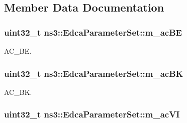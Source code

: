 \subsection{Member Data Documentation}
\subsubsection[{\texorpdfstring{m\+\_\+ac\+BE}{m_acBE}}]{\setlength{\rightskip}{0pt plus 5cm}uint32\+\_\+t ns3\+::\+Edca\+Parameter\+Set\+::m\+\_\+ac\+BE\hspace{0.3cm}{\ttfamily [private]}}\hypertarget{classns3_1_1EdcaParameterSet_a43ef5005534c79ea230fc9104640e59c}{}\label{classns3_1_1EdcaParameterSet_a43ef5005534c79ea230fc9104640e59c}


A\+C\+\_\+\+BE. 

\subsubsection[{\texorpdfstring{m\+\_\+ac\+BK}{m_acBK}}]{\setlength{\rightskip}{0pt plus 5cm}uint32\+\_\+t ns3\+::\+Edca\+Parameter\+Set\+::m\+\_\+ac\+BK\hspace{0.3cm}{\ttfamily [private]}}\hypertarget{classns3_1_1EdcaParameterSet_ae50d10f4ebb43a541435d3fda88faa10}{}\label{classns3_1_1EdcaParameterSet_ae50d10f4ebb43a541435d3fda88faa10}


A\+C\+\_\+\+BK. 

\subsubsection[{\texorpdfstring{m\+\_\+ac\+VI}{m_acVI}}]{\setlength{\rightskip}{0pt plus 5cm}uint32\+\_\+t ns3\+::\+Edca\+Parameter\+Set\+::m\+\_\+ac\+VI\hspace{0.3cm}{\ttfamily [private]}}\hypertarget{classns3_1_1EdcaParameterSet_a405a4382184174dbd1f920e6fe87595a}{}\label{classns3_1_1EdcaParameterSet_a405a4382184174dbd1f920e6fe87595a}


